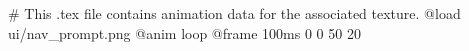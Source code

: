 # This .tex file contains animation data for the associated texture.
@load ui/nav_prompt.png
@anim loop
	@frame 100ms 0 0 50 20